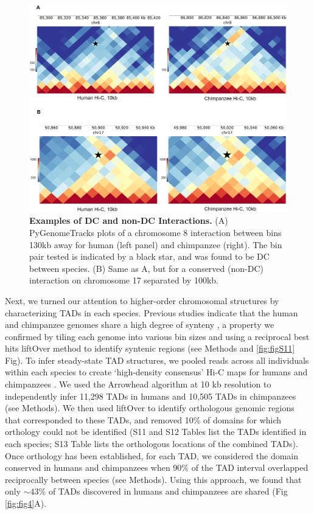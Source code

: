\begin{figure}
\centering
\includegraphics[width=6in]{img/fig3.PNG}
\caption[Examples of DC and non-DC Interactions.]{\textbf{Examples of DC and non-DC Interactions.} (A) PyGenomeTracks plots \cite{Ramirez.2018} of a chromosome 8 interaction between bins 130kb away for human (left panel) and chimpanzee (right). The bin pair tested is indicated by a black star, and was found to be DC between species. (B) Same as A, but for a conserved (non-DC) interaction on chromosome 17 separated by 100kb.}
\label{fig:fig3}
\end{figure}

Next, we turned our attention to higher-order chromosomal structures by characterizing TADs in each species. Previous studies indicate that the human and chimpanzee genomes share a high degree of synteny \cite{Yunis.1982, Yunis.1980, Scally.2012, Kehrer-sawatzki.2007, Catacchio.2018, Lee.2016}, a property we confirmed by tiling each genome into various bin sizes and using a reciprocal best hits liftOver method to identify syntenic regions (see Methods and \ref{fig:figS11} Fig). To infer steady-state TAD structures, we pooled reads across all individuals within each species to create `high-density consensus' Hi-C maps for humans and chimpanzees \cite{Durand.2016}. We used the Arrowhead algorithm at 10 kb resolution \cite{Durand.2016} to independently infer 11,298 TADs in humans and 10,505 TADs in chimpanzees (see Methods). We then used liftOver to identify orthologous genomic regions that corresponded to these TADs, and removed 10\% of domains for which orthology could not be identified (S11 and S12 Tables list the TADs identified in each species; S13 Table lists the orthologous locations of the combined TADs). Once orthology has been established, for each TAD, we considered the domain conserved in humans and chimpanzees when 90\% of the TAD interval overlapped reciprocally between species (see Methods). Using this approach, we found that only $\sim$43\% of TADs discovered in humans and chimpanzees are shared (Fig \ref{fig:fig4}A).

